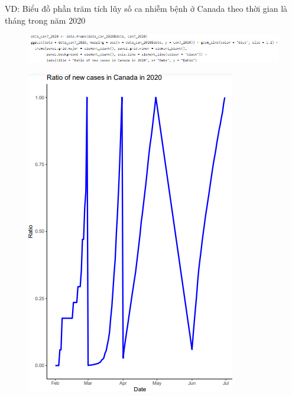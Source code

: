 \documentclass[a4paper]{article}
\theoremstyle{definition}
\begin{document}
\begin{enumerate}[i)]
\begin{enumerate}[1]
	VD: Biểu đồ phần trăm tích lũy số ca nhiễm bệnh ở Canada theo thời gian là tháng trong năm 2020
	        \begin{figure}[H]
				\centering
				\includegraphics[scale=0.8]{images/5.0.7.png}
			\end{figure}
			\begin{figure}[H]
				\centering
				\includegraphics[scale=0.8]{images/5.7.1.png}
			\end{figure}
			\begin{figure}[H]
				\centering

\end{figure}
\end{enumerate}
\end{enumerate}
\end{document}
